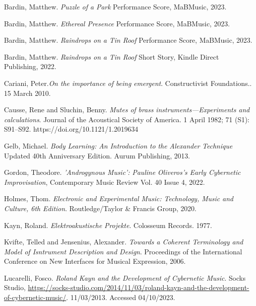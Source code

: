 \begin{thebibliography}{99} %


 Bardin, Matthew. \emph{Puzzle of a Park} Performance Score, MaBMusic, 2023.

 Bardin, Matthew. \emph{Ethereal Presence} Performance Score, MaBMusic, 2023.

 Bardin, Matthew. \emph{Raindrops on a Tin Roof} Performance Score, MaBMusic, 2023.

 Bardin, Matthew. \emph{Raindrops on a Tin Roof} Short Story, Kindle Direct Publishing, 2022.

 Cariani, Peter.\emph{On the importance of being emergent}. Constructivist Foundations.. 15 March 2010.

 Causse, Rene and Sluchin, Benny. \emph{Mutes of brass instruments—Experiments and calculations}. Journal of the Acoustical Society of America. 1 April 1982; 71 (S1): S91–S92. https://doi.org/10.1121/1.2019634


 Gelb, Michael. \emph{Body Learning: An Introduction to the Alexander Technique} Updated 40th Anniversary Edition. Aurum Publishing, 2013.

 Gordon, Theodore. \emph{'Androgynous Music': Pauline Oliveros's Early Cybernetic Improvisation}, Contemporary Music Review Vol. 40 Issue 4, 2022.

 Holmes, Thom. \emph{Electronic and Experimental Music: Technology, Music and Culture, 6th Edition}. Routledge/Taylor \& Francis Group, 2020.

 Kayn, Roland. \emph{Elektroakustische Projekte}. Colosseum Records. 1977.

 Kvifte, Telled and Jensenius, Alexander. \emph{Towards a Coherent Terminology and Model of Isntrument Description and Design}. Proceedings of the International Conference on New Interfaces for Musical Expression, 2006.

 Lucarelli, Fosco. \emph{Roland Kayn and the Development of Cybernetic Music}. Socks Studio, \url{https://socks-studio.com/2014/11/03/roland-kayn-and-the-development-of-cybernetic-music/}. 11/03/2013. Accessed 04/10/2023.


\end{thebibliography}
